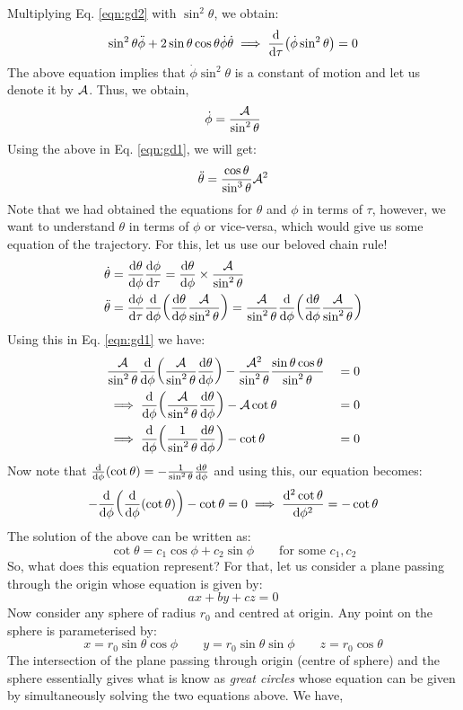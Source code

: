Multiplying Eq. \ref{eqn:gd2} with $\sin^2\theta$, we obtain:
$$\sin^2\theta\ddot{\phi} + 2\sin\theta \cos\theta\dot{\phi}\dot{\theta}\implies \dv{\tau}\qty(\dot{\phi}\sin^2\theta)=0$$
The above equation implies that $\dot{\phi}\sin^2\theta$ is a constant of motion and let us denote it by $\mathcal A$. Thus, we obtain,
$$\dot{\phi} = \frac{\mathcal A}{\sin^2\theta}$$
Using the above in Eq. \ref{eqn:gd1}, we will get:
$$\ddot{\theta} = \frac{\cos\theta}{\sin^3\theta}\mathcal A^2$$
Note that we had obtained the equations for $\theta$ and $\phi$ in terms of $\tau$, however, we want to understand $\theta$ in terms of $\phi$ or vice-versa, which would give us some equation of the trajectory. For this, let us use our beloved chain rule!
\begin{align*}
    \dot{\theta} &= \dv{\theta}{\phi}\dv{\phi}{\tau} = \dv{\theta}{\phi} \times \frac{\mathcal A}{\sin^2\theta}\\
    \ddot{\theta}&= \dv{\phi}{\tau}\dv{\phi}\qty(\dv{\theta}{\phi}\frac{\mathcal A}{\sin^2\theta}) = \frac{\mathcal A}{\sin^2\theta}\dv{\phi}\qty(\dv{\theta}{\phi}\frac{\mathcal A}{\sin^2\theta})
\end{align*}
Using this in Eq. \ref{eqn:gd1} we have:
\begin{alignat*}{3}
    &\frac{\mathcal A}{\sin^2\theta} \dv{\phi}\qty(\frac{\mathcal A}{\sin^2\theta}\dv{\theta}{\phi} )- \frac{\mathcal A^2}{\sin^2\theta} \frac{\sin\theta\cos\theta}{\sin^2\theta} &&=0\\
 &\implies \dv{\phi}\qty(\frac{\mathcal A}{\sin^2\theta}\dv{\theta}{\phi} )- \mathcal A\cot\theta &&=0\\
&\implies  \dv{\phi}\qty(\frac{1}{\sin^2\theta}\dv{\theta}{\phi} )- \cot\theta &&=0
\end{alignat*}
Now note that $\dv{\phi}(\cot\theta) = -\frac{1}{\sin^2\theta}\dv{\theta}{\phi}$ and using this, our equation becomes:
$$ -\dv{\phi}\qty(\dv{\phi}(\cot\theta) )- \cot\theta =0\implies \dv[2]{\cot\theta}{\phi} = -\cot\theta$$
The solution of the above can be written as:
\begin{equation}\cot\theta = c_1 \cos\phi+c_2\sin\phi \qquad \text{for some $c_1, c_2$}\label{eqn:gc}\end{equation}
So, what does this equation represent? For that, let us consider a plane passing through the origin whose equation is given by:
$$ax + b y + c z = 0$$
Now consider any sphere of radius $r_0$ and centred at origin. Any point on the sphere is parameterised by:
$$x=r_0 \sin\theta \cos\phi \qquad y=r_0 \sin\theta \sin\phi \qquad z = r_0\cos\theta$$
The intersection of the plane passing through origin (centre of sphere) and the sphere essentially gives what is know as \textit{great circles} whose equation can be given by simultaneously solving the two equations above. We have,
